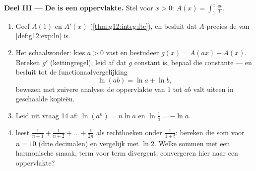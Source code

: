 \begin{problem}
\medskip
\noindent\textbf{Deel III --- De  is een oppervlakte.}
Stel voor $x > 0$: $A(x) = \displaystyle\int_1^x \frac{\dd t}{t}$.
\begin{enumerate}[resume]
  \item Geef $A(1)$ en $A'(x)$ (\cref{thm:g12:integ:ftc}), en besluit dat $A$
        precies de  van \cref{def:g12:exp:ln} is.
  \item Het schaalwonder: kies $a > 0$ vast en bestudeer
        $g(x) = A(ax) - A(x)$. Bereken $g'$ (kettingregel), leid af dat $g$
        constant is, bepaal die constante --- en besluit tot de
        functionaalvergelijking
        \[
        \ln(ab) = \ln a + \ln b ,
        \]
        bewezen met zuivere analyse: de oppervlakte van $1$ tot $ab$ valt
        uiteen in geschaalde kopieën.
  \item Leid uit vraag 14 af: $\ln(a^n) = n\ln a$ en $\ln\frac1a = -\ln a$.
  \item {} leest
        $\frac{1}{n+1} + \frac{1}{n+2} + \dots + \frac{1}{2n}$ als
        rechthoeken onder $\frac{1}{1 + t}$: bereken die som voor $n = 10$
        (drie decimalen) en vergelijk met $\ln 2$. Welke sommen met een
        harmonische smaak, term voor term divergent, convergeren hier naar een
        oppervlakte?
\end{enumerate}


\end{problem}
